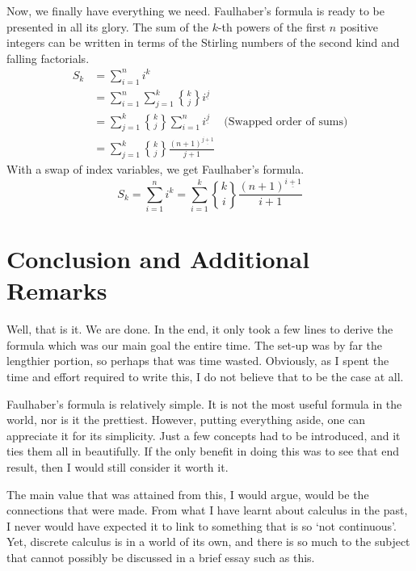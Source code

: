 \documentclass[a4paper]{article}
\theoremstyle{definition}
\begin{document}
Now, we finally have everything we need.
Faulhaber's formula is ready to be presented in all its glory.
The sum of the $k$-th powers of the first $n$ positive integers can be written in terms of the Stirling numbers of the second kind and falling factorials.
\begin{align*}
    S_k & = \sum_{i=1}^n i^k                                                                              \\
        & = \sum_{i=1}^n \sum_{j=1}^k {k\brace j} i^{\underline{j}}                                       \\
        & = \sum_{j=1}^k {k\brace j} \sum_{i=1}^n i^{\underline{j}}      & \text{(Swapped order of sums)} \\
        & = \sum_{j=1}^k {k\brace j} \frac{(n+1)^{\underline{j+1}}}{j+1}
\end{align*}
With a swap of index variables, we get Faulhaber's formula.
\begin{equation}
    S_k = \sum_{i=1}^n i^k = \sum_{i=1}^k {k\brace i} \frac{(n+1)^{\underline{i+1}}}{i+1}
\end{equation}

\section{Conclusion and Additional Remarks}

Well, that is it.
We are done.
In the end, it only took a few lines to derive the formula which was our main goal the entire time.
The set-up was by far the lengthier portion, so perhaps that was time wasted.
Obviously, as I spent the time and effort required to write this, I do not believe that to be the case at all.

Faulhaber's formula is relatively simple.
It is not the most useful formula in the world, nor is it the prettiest.
However, putting everything aside, one can appreciate it for its simplicity.
Just a few concepts had to be introduced, and it ties them all in beautifully.
If the only benefit in doing this was to see that end result, then I would still consider it worth it.

The main value that was attained from this, I would argue, would be the connections that were made.
From what I have learnt about calculus in the past, I never would have expected it to link to something that is so `not continuous'.
Yet, discrete calculus is in a world of its own, and there is so much to the subject that cannot possibly be discussed in a brief essay such as this.
\end{document}
